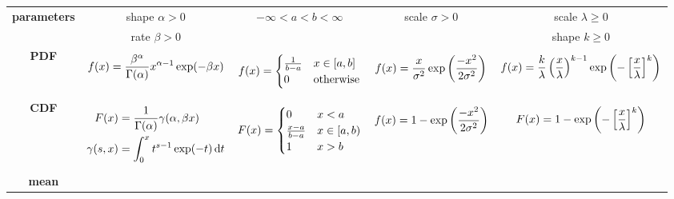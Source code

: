 \documentclass{article}
\begin{document}
\begin{landscape}
\begin{center}
\begin{tabular}{c|c|c|c|c}
				\hline
				\multirow{2}{2cm}{\textbf{parameters}}
				& shape $\alpha>0$ & $-\infty < a < b <\infty$ & scale $\sigma>0$& scale $\lambda\ge0$ \\
				& rate $\beta>0$ &&& shape $k\ge 0$ \\
				\hline
				\textbf{PDF} &
				\parbox{3cm}{\begin{align}
					f(x) = \frac{\beta^\alpha}{\Gamma(\alpha)}x^{\alpha-1}\exp(-\beta x)\notag
				\end{align}}
				&
				\parbox{3cm}{\begin{align}
					f(x)=\begin{cases}
						\frac{1}{b-a} & x\in [a,b] \\ 0 & \text{otherwise}
					\end{cases}\notag
				\end{align}}
				&
				\parbox{3cm}{\begin{align}
					f(x) = \frac{x}{\sigma^2}\exp\left(\frac{-x^2}{2\sigma^2}\right)\notag
				\end{align}}
				& 
				\parbox{3cm}{\begin{align}
					f(x) = \frac{k}{\lambda}\left(\frac{x}{\lambda}\right)^{k-1}\exp\left(-\left[\frac{x}{\lambda}\right]^k\right) \notag
				\end{align}}
				\\
				\hline
				\textbf{CDF} &
				\parbox{3cm}{\begin{align}
					F(x) &= \frac{1}{\Gamma(\alpha)}\gamma(\alpha,\beta x) \notag \\
					\gamma(s,x)&= \int_0^x t^{s-1}\exp(-t)\,\mathrm{d}t \notag
				\end{align}}
				&
				\parbox{3cm}{\begin{align}
					F(x)=\begin{cases}
					0 & x<a \\ \frac{x-a}{b-a} & x\in [a,b) \\ 1 & x>b
					\end{cases}\notag
					\end{align}}
				&
				\parbox{3cm}{\begin{align}
					f(x) = 1-\exp\left(\frac{-x^2}{2\sigma^2}\right)\notag
					\end{align}}
				& 
				\parbox{3cm}{\begin{align}
					F(x) = 1-\exp\left(-\left[\frac{x}{\lambda}\right]^k\right) \notag
					\end{align}}
				\\
				\hline
				\textbf{mean} &
				\parbox{3cm}{\begin{align}

\end{align}}
\end{tabular}
\end{center}
\end{landscape}
\end{document}
